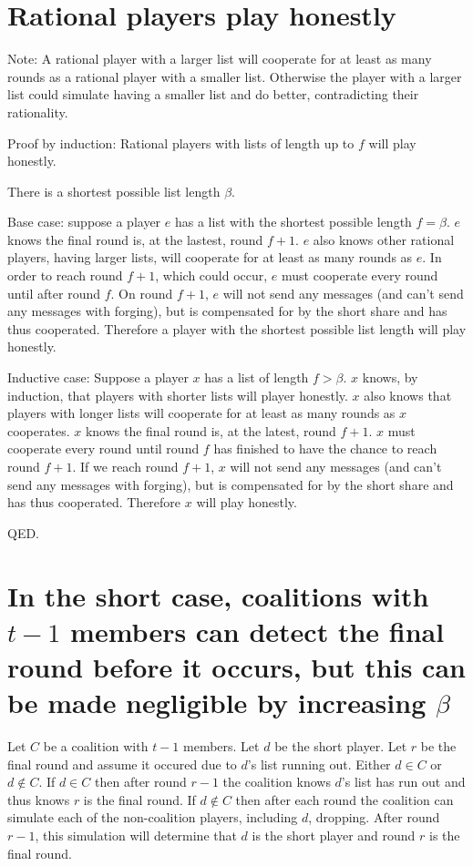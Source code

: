 \documentclass{dalcsthesis}
\begin{document}
\section{Rational players play honestly}

Note: A rational player with a larger list will cooperate for at least as many rounds as a rational player with a smaller list. Otherwise the player with a larger list could simulate having a smaller list and do better, contradicting their rationality.

Proof by induction: Rational players with lists of length up to $f$ will play honestly.

There is a shortest possible list length $\beta$.

Base case: suppose a player $e$ has a list with the shortest possible length $f = \beta$. $e$ knows the final round is, at the lastest, round $f+1$. $e$ also knows other rational players, having larger lists, will cooperate for at least as many rounds as $e$. In order to reach round $f+1$, which could occur, $e$ must cooperate every round until after round $f$. On round $f+1$, $e$ will not send any messages (and can't send any messages with forging), but is compensated for by the short share and has thus cooperated. Therefore a player with the shortest possible list length will play honestly.

Inductive case: Suppose a player $x$ has a list of length $f > \beta$. $x$ knows, by induction, that players with shorter lists will player honestly. $x$ also knows that players with longer lists will cooperate for at least as many rounds as $x$ cooperates. $x$ knows the final round is, at the latest, round $f+1$. $x$ must cooperate every round until round $f$ has finished to have the chance to reach round $f+1$. If we reach round $f+1$, $x$ will not send any messages (and can't send any messages with forging), but is compensated for by the short share and has thus cooperated. Therefore $x$ will play honestly.

QED.

\section{In the short case, coalitions with $t-1$ members can detect the final round before it occurs, but this can be made negligible by increasing $\beta$}

Let $C$ be a coalition with $t-1$ members. Let $d$ be the short player. Let $r$ be the final round and assume it occured due to $d$'s list running out. Either $d \in C$ or $d \notin C$. If $d \in C$ then after round $r-1$ the coalition knows $d$'s list has run out and thus knows $r$ is the final round. If $d \notin C$ then after each round the coalition can simulate each of the non-coalition players, including $d$, dropping. After round $r-1$, this simulation will determine that $d$ is the short player and round $r$ is the final round.
\end{document}
